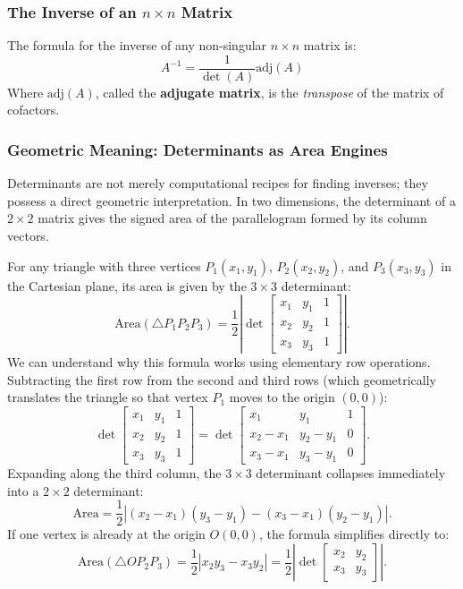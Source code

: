 \subsubsection*{The Inverse of an $n \times n$ Matrix}

The formula for the inverse of any non-singular $n \times n$ matrix is:
\[
A^{-1} = \frac{1}{\det(A)} \text{adj}(A)
\]
Where $\text{adj}(A)$, called the \textbf{adjugate matrix}, is the \emph{transpose} of the matrix of cofactors.

\subsubsection*{Geometric Meaning: Determinants as Area Engines}

Determinants are not merely computational recipes for finding inverses; they possess a direct geometric interpretation. In two dimensions, the determinant of a $2 \times 2$ matrix gives the signed area of the parallelogram formed by its column vectors.

For any triangle with three vertices $P_1(x_1, y_1)$, $P_2(x_2, y_2)$, and $P_3(x_3, y_3)$ in the Cartesian plane, its area is given by the $3 \times 3$ determinant:
\[
\text{Area}(\triangle P_1 P_2 P_3) = \frac{1}{2} \left| \det \begin{bmatrix} x_1 & y_1 & 1 \\ x_2 & y_2 & 1 \\ x_3 & y_3 & 1 \end{bmatrix} \right|.
\]
We can understand why this formula works using elementary row operations. Subtracting the first row from the second and third rows (which geometrically translates the triangle so that vertex $P_1$ moves to the origin $(0,0)$):
\[
\det \begin{bmatrix} x_1 & y_1 & 1 \\ x_2 & y_2 & 1 \\ x_3 & y_3 & 1 \end{bmatrix}
= \det \begin{bmatrix} x_1 & y_1 & 1 \\ x_2 - x_1 & y_2 - y_1 & 0 \\ x_3 - x_1 & y_3 - y_1 & 0 \end{bmatrix}.
\]
Expanding along the third column, the $3 \times 3$ determinant collapses immediately into a $2 \times 2$ determinant:
\[
\text{Area} = \frac{1}{2} \left| (x_2 - x_1)(y_3 - y_1) - (x_3 - x_1)(y_2 - y_1) \right|.
\]
If one vertex is already at the origin $O(0,0)$, the formula simplifies directly to:
\[
\text{Area}(\triangle OP_2 P_3) = \frac{1}{2} |x_2 y_3 - x_3 y_2| = \frac{1}{2} \left| \det \begin{bmatrix} x_2 & y_2 \\ x_3 & y_3 \end{bmatrix} \right|.
\]

